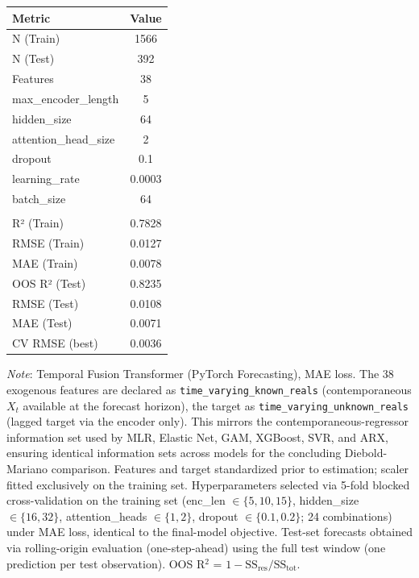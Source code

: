 \begin{tabular}{lc}
  \toprule
  \textbf{Metric} & \textbf{Value} \\ 
  \midrule
  N (Train) & 1566 \\ 
  N (Test) & 392 \\ 
  Features & 38 \\ 
  max\_encoder\_length & 5 \\ 
  hidden\_size & 64 \\ 
  attention\_head\_size & 2 \\ 
  dropout & 0.1 \\ 
  learning\_rate & 0.0003 \\ 
  batch\_size & 64 \\ 
   &  \\ 
  R² (Train) & 0.7828 \\ 
  RMSE (Train) & 0.0127 \\ 
  MAE (Train) & 0.0078 \\ 
  OOS R² (Test) & 0.8235 \\ 
  RMSE (Test) & 0.0108 \\ 
  MAE (Test) & 0.0071 \\ 
  CV RMSE (best) & 0.0036 \\ 
  \bottomrule
\end{tabular}
\par\vspace{4pt}
\begin{minipage}{\linewidth}
  \footnotesize \textit{Note}: Temporal Fusion Transformer (PyTorch Forecasting), MAE loss. The 38 exogenous features are declared as \texttt{time\_varying\_known\_reals} (contemporaneous $X_t$ available at the forecast horizon), the target as \texttt{time\_varying\_unknown\_reals} (lagged target via the encoder only). This mirrors the contemporaneous-regressor information set used by MLR, Elastic Net, GAM, XGBoost, SVR, and ARX, ensuring identical information sets across models for the concluding Diebold-Mariano comparison. Features and target standardized prior to estimation; scaler fitted exclusively on the training set. Hyperparameters selected via 5-fold blocked cross-validation on the training set (enc\_len $\in \{5, 10, 15\}$, hidden\_size $\in \{16, 32\}$, attention\_heads $\in \{1, 2\}$, dropout $\in \{0.1, 0.2\}$; 24 combinations) under MAE loss, identical to the final-model objective. Test-set forecasts obtained via rolling-origin evaluation (one-step-ahead) using the full test window (one prediction per test observation). OOS R$^2$ = $1 - \text{SS}_{\text{res}} / \text{SS}_{\text{tot}}$.
\end{minipage}